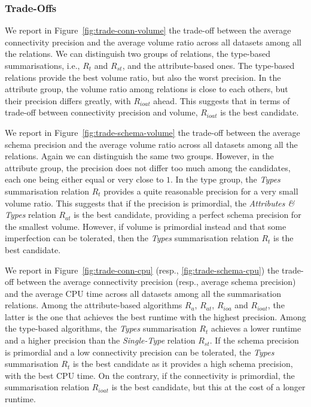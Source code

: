 \subsubsection{Trade-Offs}

We report in Figure~\ref{fig:trade-conn-volume} the trade-off between the average connectivity precision and the average volume ratio across all datasets among all the relations. We can distinguish two groups of relations, the type-based summarisations, i.e., $R_t$ and $R_{st}$, and the attribute-based ones.
The type-based relations provide the best volume ratio, but also the worst precision. In the attribute group, the volume ratio among relations is close to each others, but their precision differs greatly, with $R_{ioat}$ ahead. This suggests that in terms of trade-off between connectivity precision and volume, $R_{ioat}$ is the best candidate.

We report in Figure~\ref{fig:trade-schema-volume} the trade-off between the average schema precision and the average volume ratio across all datasets among all the relations. Again we can distinguish the same two groups. However, in the attribute group, the precision does not differ too much among the candidates, each one being either equal or very close to $1$. In the type group, the \emph{Types} summarisation relation $R_t$ provides a quite reasonable precision for a very small volume ratio. This suggests that if the precision is primordial, the \emph{Attributes \& Types} relation $R_{at}$ is the best candidate, providing a perfect schema precision for the smallest volume. However, if volume is primordial instead and that some imperfection can be tolerated, then the \emph{Types} summarisation relation $R_t$ is the best candidate.

We report in Figure~\ref{fig:trade-conn-cpu} (resp., \ref{fig:trade-schema-cpu}) the trade-off between the average connectivity precision (resp., average schema precision) and the average CPU time across all datasets among all the summarisation relations. Among the attribute-based algorithms $R_a$, $R_{at}$, $R_{ioa}$ and $R_{ioat}$, the latter is the one that achieves the best runtime with the highest precision. Among the type-based algorithms, the \emph{Types} summarisation $R_t$ achieves a lower runtime and a higher precision than the \emph{Single-Type} relation $R_{st}$.
If the schema precision is primordial and a low connectivity precision can be tolerated, the \emph{Types} summarisation $R_t$ is the best candidate as it provides a high schema precision, with the best CPU time. On the contrary, if the connectivity is primordial, the summarisation relation $R_{ioat}$ is the best candidate, but this at the cost of a longer runtime.

